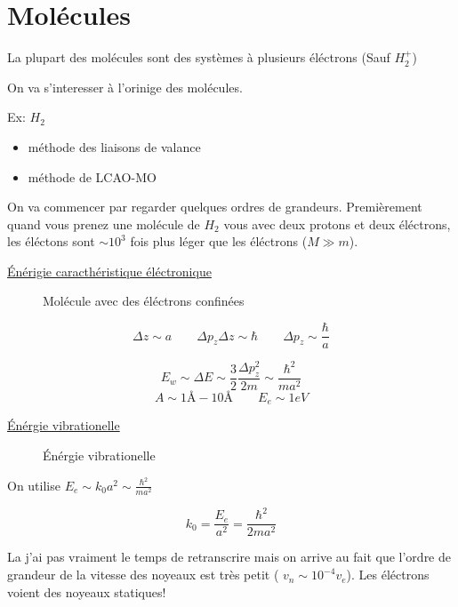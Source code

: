 



\section*{Molécules}

La plupart des molécules sont des systèmes à plusieurs éléctrons (Sauf $H_{2}^+$)

On va s'interesser à l'orinige des molécules.

Ex: $H_{2}$\begin{itemize}
	\item méthode des liaisons de valance
	\item méthode de LCAO-MO
\end{itemize}

On va commencer par regarder quelques ordres de grandeurs. Premièrement quand vous prenez une molécule de $H_{2}$ vous avec deux protons et deux éléctrons, les éléctons sont $\sim 10^3$ fois plus léger que les éléctrons ($M \gg m$). 

\underline{Énérigie caracthéristique éléctronique} 


\begin{figure}[ht]
    \centering
    \caption{Molécule avec des éléctrons confinées}
    \label{fig:molécule-avec-des-éléctrons-confinées}
\end{figure}
$$\Delta z \sim a \qquad \Delta p_{z} \Delta z \sim \hbar \qquad \Delta p_{z} \sim \frac{\hbar}{a} $$ 

$$E_{w} \sim \Delta E \sim \frac{3}{2} \frac{\Delta p_{z}^2}{2m} \sim \frac{\hbar^2}{ma^2} $$ 
$$A \sim 1 \text{\AA} - 10 \text{\AA} \qquad E_{e} \sim 1 eV$$ 

\underline{Énérgie vibrationelle} 

\begin{figure}[ht]
    \centering
    \caption{Énérgie vibrationelle}
    \label{fig:énérgie-vibrationelle}
\end{figure}

On utilise $E_{e} \sim k_{0} a^2 \sim \frac{\hbar^2}{ma^2} $ 

$$k_{0} = \frac{E_{e}}{a^2} =\frac{\hbar^2}{2ma^2} $$ 

La j'ai pas vraiment le temps de retranscrire mais on arrive au fait que l'ordre de grandeur de la vitesse des noyeaux est très petit ( $v_{n} \sim 10^{-4} v_e$). Les éléctrons voient des noyeaux statiques!

